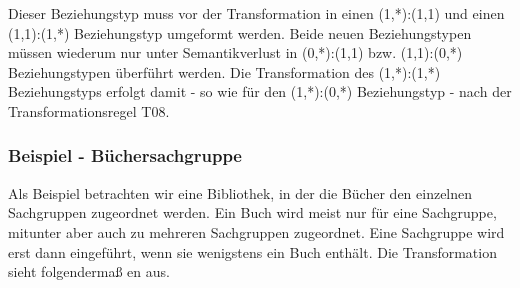         \begin{center}
        \end{center}
        Dieser Beziehungstyp muss vor der Transformation in einen (1,*):(1,1) und einen\\ (1,1):(1,*) Beziehungstyp umgeformt werden. Beide neuen Beziehungstypen müssen wiederum nur unter Semantikverlust in (0,*):(1,1) bzw. (1,1):(0,*) Beziehungstypen über\-führt werden. Die Transformation des (1,*):(1,*) Beziehungstyps erfolgt damit - so wie für den (1,*):(0,*) Beziehungstyp - nach der Transformationsregel T08.
        \subsubsection{Beispiel - Büchersachgruppe}
          Als Beispiel betrachten wir eine Bibliothek, in der die Bücher den
          einzelnen Sachgruppen zugeordnet werden. Ein Buch wird meist nur für
          eine Sachgruppe, mitunter aber auch zu mehreren Sachgruppen
          zugeordnet. Eine Sachgruppe wird erst dann eingeführt, wenn sie
          wenigstens ein Buch enthält. Die Transformation sieht folgendermaß
          en aus.


